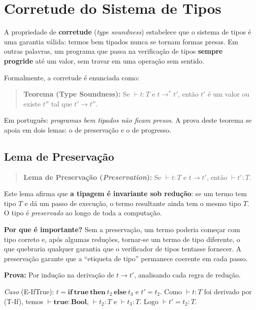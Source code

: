 \section{Corretude do Sistema de Tipos}

A propriedade de \textbf{corretude} (\emph{type soundness})
estabelece que o sistema de tipos é uma garantia válida: termos bem
tipados nunca se tornam formas presas. Em outras palavras, um
programa que passa na verificação de tipos \textbf{sempre progride}
até um valor, sem travar em uma operação sem sentido.

Formalmente, a corretude é enunciada como:

\begin{quote}
  \textbf{Teorema (Type Soundness):} Se \(\vdash t : T\) e \(t \to^*
  t'\), então \(t'\) é um valor ou existe \(t''\) tal que \(t' \to t''\).
\end{quote}

Em português: \emph{programas bem tipados não ficam presos}. A prova
deste teorema se apoia em dois lemas: o de preservação e o de progresso.

\subsection{Lema de Preservação}

\begin{quote}
  \textbf{Lema de Preservação (\emph{Preservation}):} Se \(\vdash t : T\) e
  \(t \to t'\), então \(\vdash t' : T\).
\end{quote}

Este lema afirma que \textbf{a tipagem é invariante sob redução}: se
um termo tem tipo \(T\) e dá um passo de execução, o termo resultante
ainda tem o mesmo tipo \(T\). O tipo é \emph{preservado} ao longo de
toda a computação.

\textbf{Por que é importante?} Sem a preservação, um termo poderia
começar com tipo correto e, após algumas reduções, tornar-se um termo
de tipo diferente, o que quebraria qualquer garantia que o
verificador de tipos tentasse fornecer. A preservação garante que a
``etiqueta de tipo'' permanece coerente em cada passo.

\textbf{Prova:} Por indução na derivação de \(t \to t'\), analisando
cada regra de redução.

\emph{Caso} (E-IfTrue): \(t =
\mathbf{if}\ \mathbf{true}\ \mathbf{then}\ t_2\ \mathbf{else}\ t_3\)
e \(t' = t_2\). Como \(\vdash t : T\) foi derivado por (T-If), temos
\(\vdash \mathbf{true} : \mathbf{Bool}\), \(\vdash t_2 : T\) e
\(\vdash t_3 : T\). Logo \(\vdash t' = t_2 : T\).

